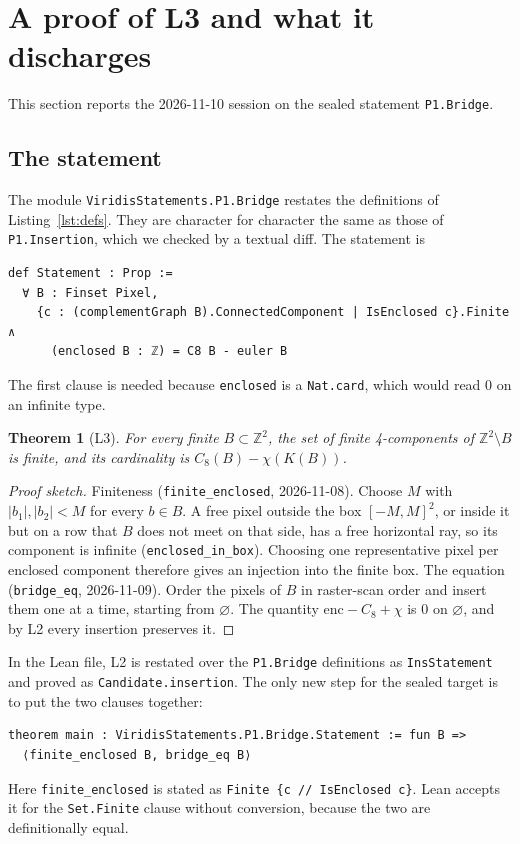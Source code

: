 \documentclass[11pt]{article}
\newtheorem{theorem}{Theorem}
\theoremstyle{definition}
\theoremstyle{remark}
\begin{document}
\section{A proof of L3 and what it discharges}\label{sec:l3}

This section reports the 2026-11-10 session on the sealed statement \texttt{P1.Bridge}.

\subsection{The statement}

The module \texttt{ViridisStatements.P1.Bridge} restates the definitions of
Listing~\ref{lst:defs}. They are character for character the same as those of
\texttt{P1.Insertion}, which we checked by a textual diff. The statement is
\begin{lstlisting}
def Statement : Prop :=
  ∀ B : Finset Pixel,
    {c : (complementGraph B).ConnectedComponent | IsEnclosed c}.Finite ∧
      (enclosed B : ℤ) = C8 B - euler B
\end{lstlisting}
The first clause is needed because \texttt{enclosed} is a \texttt{Nat.card}, which
would read $0$ on an infinite type.

\begin{theorem}[L3]\label{thm:l3}
For every finite $B\subset\mathbb{Z}^2$, the set of finite 4-components of
$\mathbb{Z}^2\setminus B$ is finite, and its cardinality is $C_8(B)-\chi(K(B))$.
\end{theorem}

\begin{proof}[Proof sketch]
Finiteness (\texttt{finite\_enclosed}, 2026-11-08). Choose $M$ with $|b_1|,|b_2|<M$ for every
$b\in B$. A free pixel outside the box $[-M,M]^2$, or inside it but on a row that $B$
does not meet on that side, has a free horizontal ray, so its component is infinite
(\texttt{enclosed\_in\_box}). Choosing one representative pixel per enclosed component
therefore gives an injection into the finite box.
The equation (\texttt{bridge\_eq}, 2026-11-09). Order the pixels of $B$ in raster-scan order
and insert them one at a time, starting from $\varnothing$. The quantity
$\mathrm{enc}-C_8+\chi$ is $0$ on $\varnothing$, and by L2 every insertion preserves it.
\end{proof}

In the Lean file, L2 is restated over the \texttt{P1.Bridge} definitions as
\texttt{InsStatement} and proved as \texttt{Candidate.insertion}. The only new step for the
sealed target is to put the two clauses together:
\begin{lstlisting}
theorem main : ViridisStatements.P1.Bridge.Statement := fun B =>
  ⟨finite_enclosed B, bridge_eq B⟩
\end{lstlisting}
Here \texttt{finite\_enclosed} is stated as \texttt{Finite \{c // IsEnclosed c\}}. Lean accepts it
for the \texttt{Set.Finite} clause without conversion, because the two are definitionally
equal.
\end{document}
